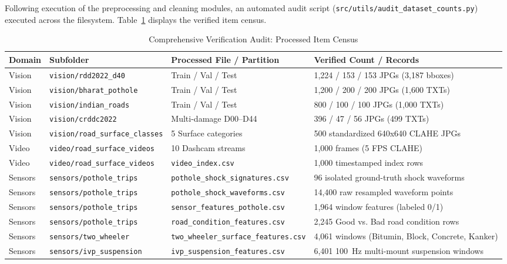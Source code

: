 \documentclass[11pt,a4paper]{article}
\begin{document}
Following execution of the preprocessing and cleaning modules, an automated audit script (\texttt{src/utils/audit\_dataset\_counts.py}) executed across the filesystem. Table~\ref{tab:census} displays the verified item census.

\begin{table}[htbp]
\centering
\small
\caption{Comprehensive Verification Audit: Processed Item Census}
\label{tab:census}
\begin{tabularx}{\textwidth}{llp{3.2cm}p{5.2cm}}
\toprule
\textbf{Domain} & \textbf{Subfolder} & \textbf{Processed File / Partition} & \textbf{Verified Count / Records} \\
\midrule
Vision & \texttt{vision/rdd2022\_d40} & Train / Val / Test & 1,224 / 153 / 153 JPGs (3,187 bboxes) \\
Vision & \texttt{vision/bharat\_pothole} & Train / Val / Test & 1,200 / 200 / 200 JPGs (1,600 TXTs) \\
Vision & \texttt{vision/indian\_roads} & Train / Val / Test & 800 / 100 / 100 JPGs (1,000 TXTs) \\
Vision & \texttt{vision/crddc2022} & Multi-damage D00--D44 & 396 / 47 / 56 JPGs (499 TXTs) \\
Vision & \texttt{vision/road\_surface\_classes} & 5 Surface categories & 500 standardized 640x640 CLAHE JPGs \\
\midrule
Video & \texttt{video/road\_surface\_videos} & 10 Dashcam streams & 1,000 frames (5 FPS CLAHE) \\
Video & \texttt{video/road\_surface\_videos} & \texttt{video\_index.csv} & 1,000 timestamped index rows \\
\midrule
Sensors & \texttt{sensors/pothole\_trips} & \texttt{pothole\_shock\_signatures.csv} & 96 isolated ground-truth shock waveforms \\
Sensors & \texttt{sensors/pothole\_trips} & \texttt{pothole\_shock\_waveforms.csv} & 14,400 raw resampled waveform points \\
Sensors & \texttt{sensors/pothole\_trips} & \texttt{sensor\_features\_pothole.csv} & 1,964 window features (labeled 0/1) \\
Sensors & \texttt{sensors/pothole\_trips} & \texttt{road\_condition\_features.csv} & 2,245 Good vs. Bad road condition rows \\
Sensors & \texttt{sensors/two\_wheeler} & \texttt{two\_wheeler\_surface\_features.csv} & 4,061 windows (Bitumin, Block, Concrete, Kanker) \\
Sensors & \texttt{sensors/ivp\_suspension} & \texttt{ivp\_suspension\_features.csv} & 6,401 100~Hz multi-mount suspension windows \\

\end{tabularx}
\end{table}
\end{document}
